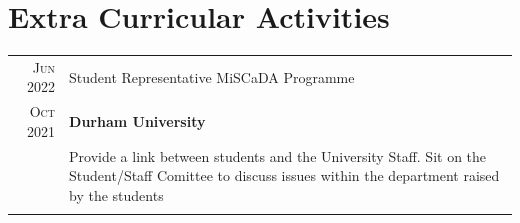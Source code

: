 \documentclass[a4paper,10pt]{article} %
\begin{document}

\section{Extra Curricular Activities}
\bigskip
\begin{tabular}{r|p{11cm}}
	\textsc{Jun 2022} & Student Representative MiSCaDA Programme\\
	\textsc{Oct 2021}&\footnotesize{\textbf{Durham University}}\\
	&\footnotesize{Provide a link between students and the University Staff. Sit on the Student/Staff Comittee to discuss issues within the department raised by the students}\\
	\multicolumn{2}{c}{} \\
\end{tabular}
\end{document}
